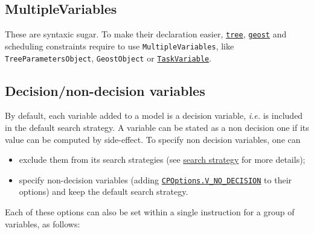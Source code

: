 
\subsection{MultipleVariables}\label{model:multiplevariables}\hypertarget{model:multiplevariables}{}
These are syntaxic sugar. To make their declaration easier, \hyperlink{tree:treeconstraint}{\tt tree}, \hyperlink{geost:geostconstraint}{\tt geost} and scheduling constraints require to use {\tt MultipleVariables}, like \texttt{TreeParametersObject}, \texttt{GeostObject} or \hyperlink{taskvariable}{\tt TaskVariable}.



\subsection{Decision/non-decision variables}\label{model:decisionvariables}\hypertarget{model:decisionvariables}{}

By default, each variable added to a model is a decision variable, \textit{i.e.} is included in the default search strategy. A variable can be stated as a non decision one if its value can be computed by side-effect. To specify non decision variables, one can 
\begin{itemize}
\item exclude them from its search strategies (see \hyperlink{solver:searchstrategy}{search strategy} for more details);
\item specify non-decision variables (adding \hyperlink{vnodecision:vnodecisionoptions}{\tt CPOptions.V\_NO\_DECISION} to their options) and keep the default search strategy.
\end{itemize}

Each of these options can also be set within a single instruction for a group of variables, as follows: 


